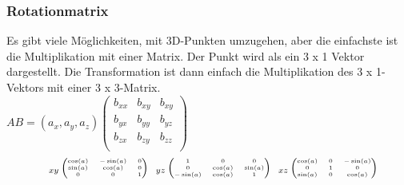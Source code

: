 \documentclass{beamer}
\begin{document}
\begin{frame}
	\frametitle{Rotationmatrix}
	\vspace{0.3cm}
	\textmd{\small Es gibt viele Möglichkeiten, mit 3D-Punkten umzugehen, aber die einfachste ist die Multiplikation mit einer Matrix. Der Punkt wird als ein 3 x 1 Vektor dargestellt. Die Transformation ist dann einfach die Multiplikation des 3 x 1-Vektors mit einer 3 x 3-Matrix.} \\
	\vspace{0.5cm}
	\centering
	$ AB = (a_{x}, a_{y}, a_{z})
	\begin{pmatrix}
		b_{xx} & b_{xy} & b_{xy} \\
		b_{yx} & b_{yy} & b_{yz} \\
		b_{zx} & b_{zy} & b_{zz} \\
	\end{pmatrix}
	$
	\vspace{0.5cm}
	\[
	\quad
	\tiny _{xy}
	\begin{pmatrix}
		\cos(a) & -\sin(a) & 0 \\
		\sin(a) & \cos(a) & 0 \\
		0 & 0 & 1
	\end{pmatrix}
	\quad \! _{yz}
	\begin{pmatrix}
		1 & 0 & 0 \\
		0 & \cos(a) & \sin(a) \\
		-\sin(a) & \cos(a) & 1 
	\end{pmatrix}
	\quad \! _{xz}
	\begin{pmatrix}
		\cos(a) & 0 & -\sin(a) \\
		0 & 1 & 0 \\
		\sin(a) & 0 & \cos(a)
	\end{pmatrix}
	\]
	
\end{frame}
	
\end{document}
